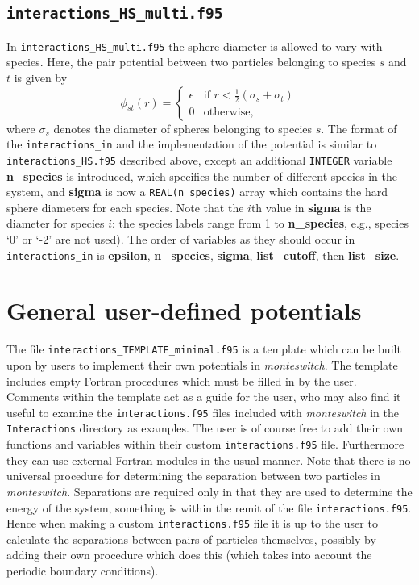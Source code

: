 \documentclass{report}
\begin{document}
\subsection{\texttt{interactions\_HS\_multi.f95}}
In \texttt{interactions\_HS\_multi.f95} the sphere diameter is allowed to vary with species. Here, the pair potential between two particles
belonging to species $s$ and $t$ is given by
\begin{equation}
\phi_{st}(r)=
\begin{cases} 
\epsilon & \text{if }r<\frac{1}{2}(\sigma_s+\sigma_t) \\
0 & \text{otherwise},
\end{cases}
\end{equation}
where $\sigma_s$ denotes the diameter of spheres belonging to species $s$. The format of the \texttt{interactions\_in}
and the implementation of the potential is similar to \texttt{interactions\_HS.f95} described above, except an additional
\texttt{INTEGER} variable \textbf{n\_species} is introduced, which specifies the number of different species in the system,
and \textbf{sigma} is now a \texttt{REAL(n\_species)} array which contains the hard sphere diameters for each species. Note
that the $i$th value in \textbf{sigma} is the diameter for species $i$: the species labels range from 1 to 
\textbf{n\_species}, e.g., species `0' or `-2' are not used).
The order of variables as they should occur in \texttt{interactions\_in} is \textbf{epsilon}, \textbf{n\_species}, \textbf{sigma}, 
\textbf{list\_cutoff}, then \textbf{list\_size}.


\section{General user-defined potentials}
The file \texttt{interactions\_TEMPLATE\_minimal.f95} is a template which can be built upon by users to implement their own potentials
in \emph{monteswitch}. The template includes empty Fortran procedures which must be filled in by the user. Comments within the template
act as a guide for the user, who may also find it useful to examine the \texttt{interactions.f95} files included with \emph{monteswitch} in the 
\texttt{Interactions} directory as examples. The user is of course free to add their own functions and variables within their custom
\texttt{interactions.f95} file. Furthermore they can use external Fortran modules in the usual manner. 
%
Note that there is no universal procedure for determining the separation between two particles in \emph{monteswitch}. Separations are
required only in that they are used to determine the energy of the system, something is within the remit of the file 
\texttt{interactions.f95}. Hence when making a custom \texttt{interactions.f95} file it is up to the user to calculate the separations
between pairs of particles themselves, possibly by adding their own procedure which does this (which takes into account the periodic
boundary conditions). 
\end{document}
